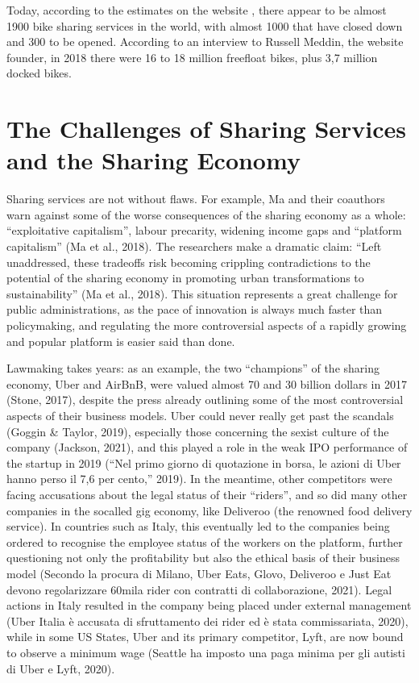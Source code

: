 \documentclass[letterpaper,10pt,english]{jupyterBook}
\begin{document}
\sphinxAtStartPar
Today, according to the estimates on the website , there appear to be almost 1900 bike sharing services in the world, with almost 1000 that have closed down and 300 to be opened. According to an interview to Russell Meddin, the website founder, in 2018 there were 16 to 18 million free\sphinxhyphen{}float bikes, plus 3,7 million docked bikes.


\section{The Challenges of Sharing Services and the Sharing Economy}
\label{\detokenize{02-bikesharing_and_bikemi:the-challenges-of-sharing-services-and-the-sharing-economy}}
\sphinxAtStartPar
Sharing services are not without flaws. For example, Ma and their coauthors warn against some of the worse consequences of the sharing economy as a whole: “exploitative capitalism”, labour precarity, widening income gaps and “platform capitalism” (Ma et al., 2018). The researchers make a dramatic claim: “Left unaddressed, these trade\sphinxhyphen{}offs risk becoming crippling contradictions to the potential of the sharing economy in promoting urban transformations to sustainability” (Ma et al., 2018). This situation represents a great challenge for public administrations, as the pace of innovation is always much faster than policy\sphinxhyphen{}making, and regulating the more controversial aspects of a rapidly growing and popular platform is easier said than done.

\sphinxAtStartPar
Lawmaking takes years: as an example, the two “champions” of the sharing economy, Uber and AirBnB, were valued almost 70 and 30 billion dollars in 2017 (Stone, 2017), despite the press already outlining some of the most controversial aspects of their business models. Uber could never really get past the scandals (Goggin \& Taylor, 2019), especially those concerning the sexist culture of the company (Jackson, 2021), and this played a role in the weak IPO performance of the startup in 2019 (“Nel primo giorno di quotazione in borsa, le azioni di Uber hanno perso il 7,6 per cento,” 2019). In the meantime, other competitors were facing accusations about the legal status of their “riders”, and so did many other companies in the so\sphinxhyphen{}called gig economy, like Deliveroo (the renowned food delivery service). In countries such as Italy, this eventually led to the companies being ordered to recognise the employee status of the workers on the platform, further questioning not only the profitability but also the ethical basis of their business model (Secondo la procura di Milano, Uber Eats, Glovo, Deliveroo e Just Eat devono regolarizzare 60mila rider con contratti di collaborazione, 2021). Legal actions in Italy resulted in the company being placed under external management (Uber Italia è accusata di sfruttamento dei rider ed è stata commissariata, 2020), while in some US States, Uber and its primary competitor, Lyft, are now bound to observe a minimum wage (Seattle ha imposto una paga minima per gli autisti di Uber e Lyft, 2020).
\end{document}
